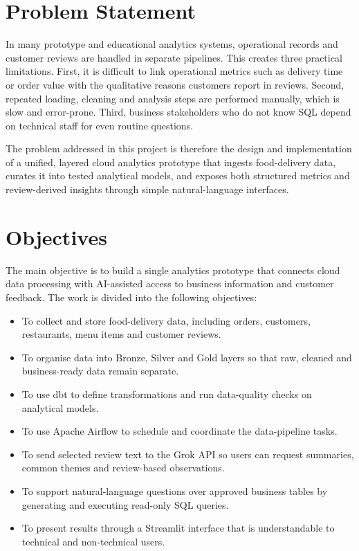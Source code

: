 \documentclass[12pt,a4paper]{report}
\begin{document}
\section{Problem Statement}
In many prototype and educational analytics systems, operational records and customer reviews are handled in separate pipelines. This creates three practical limitations. First, it is difficult to link operational metrics such as delivery time or order value with the qualitative reasons customers report in reviews. Second, repeated loading, cleaning and analysis steps are performed manually, which is slow and error-prone. Third, business stakeholders who do not know SQL depend on technical staff for even routine questions.

The problem addressed in this project is therefore the design and implementation of a unified, layered cloud analytics prototype that ingests food-delivery data, curates it into tested analytical models, and exposes both structured metrics and review-derived insights through simple natural-language interfaces.

\section{Objectives}
The main objective is to build a single analytics prototype that connects cloud data processing with AI-assisted access to business information and customer feedback. The work is divided into the following objectives:
\begin{itemize}[leftmargin=2em]
\item To collect and store food-delivery data, including orders, customers, restaurants, menu items and customer reviews.
\item To organise data into Bronze, Silver and Gold layers so that raw, cleaned and business-ready data remain separate.
\item To use dbt to define transformations and run data-quality checks on analytical models.
\item To use Apache Airflow to schedule and coordinate the data-pipeline tasks.
\item To send selected review text to the Grok API so users can request summaries, common themes and review-based observations.
\item To support natural-language questions over approved business tables by generating and executing read-only SQL queries.
\item To present results through a Streamlit interface that is understandable to technical and non-technical users.
\end{itemize}
\end{document}
